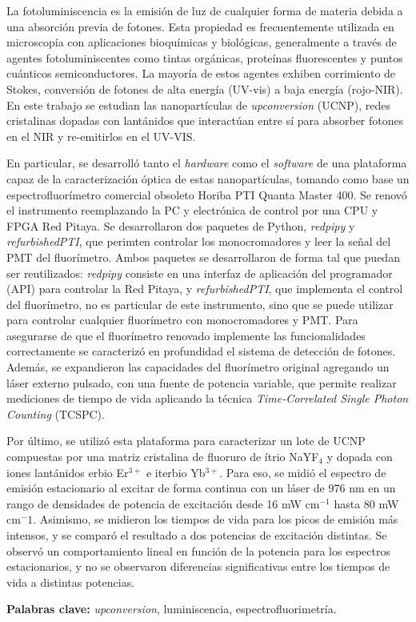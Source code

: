 
La fotoluminiscencia es la emisión de luz de cualquier forma de materia debida a una absorción previa de fotones. 
Esta propiedad es frecuentemente utilizada en microscopía con aplicaciones bioquímicas y biológicas, generalmente a través de agentes fotoluminiscentes como tintas orgánicas, proteínas fluorescentes y puntos cuánticos semiconductores. 
La mayoría de estos agentes exhiben corrimiento de Stokes, conversión de fotones de alta energía (UV-vis) a baja energía (rojo-NIR).
En este trabajo se estudian las nanopartículas de \textit{upconversion} (UCNP), redes cristalinas dopadas con lantánidos que interactúan entre sí para absorber fotones en el NIR y re-emitirlos en el UV-VIS.

En particular, se desarrolló tanto el \textit{hardware} como el \textit{software} de una plataforma capaz de la caracterización óptica de estas nanopartículas, tomando como base un espectrofluorímetro comercial obsoleto Horiba PTI Quanta Master 400.
Se renovó el instrumento reemplazando la PC y electrónica de control por una CPU y FPGA Red Pitaya.
Se desarrollaron dos paquetes de Python, \textit{redpipy} y \textit{refurbishedPTI}, que perimten controlar los monocromadores y leer la señal del PMT del fluorímetro.
Ambos paquetes se desarrollaron de forma tal que puedan ser reutilizados: \textit{redpipy} consiste en una interfaz de aplicación del programador (API) para controlar la Red Pitaya, y \textit{refurbishedPTI}, que implementa el control del fluorímetro, no es particular de este instrumento, sino que se puede utilizar para controlar cualquier fluorímetro con monocromadores y PMT.
Para asegurarse de que el fluorímetro renovado implemente las funcionalidades correctamente se caracterizó en profundidad el sistema de detección de fotones.
Además, se expandieron las capacidades del fluorímetro original agregando un láser externo pulsado, con una fuente de potencia variable, que permite realizar mediciones de tiempo de vida aplicando la técnica \textit{Time-Correlated Single Photon Counting} (TCSPC).

Por último, se utilizó esta plataforma para caracterizar un lote de UCNP compuestas por una matriz cristalina de fluoruro de ítrio NaYF$_4$ y dopada con iones lantánidos erbio Er$^{3+}$ e iterbio Yb$^{3+}$.
Para eso, se midió el espectro de emisión estacionario al excitar de forma continua con un láser de 976 nm en un rango de densidades de potencia de excitación desde 16 mW cm$^{-1}$ hasta 80 mW cm$^-1$.
Asimismo, se midieron los tiempos de vida para los picos de emisión más intensos, y se comparó el resultado a dos potencias de excitación distintas.
Se observó un comportamiento lineal en función de la potencia para los espectros estacionarios, y no se observaron diferencias significativas entre los tiempos de vida a distintas potencias.

\textbf{Palabras clave:} \textit{upconversion}, luminiscencia, espectrofluorimetría.




